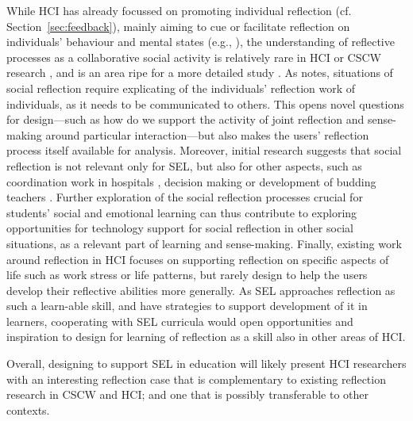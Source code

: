 \documentclass[prodmode,acmtochi]{acmsmall}
\begin{document}
While HCI has already focussed on promoting individual reflection (cf. Section~\ref{sec:feedback}), mainly aiming to cue or facilitate reflection on individuals' behaviour and mental states (e.g., \cite{Sas2011,Stahl2008,Thieme2011,Isaacs2013}), the understanding of reflective processes as a collaborative social activity is relatively rare in HCI or CSCW research \cite{Fleck2012,Prilla2012}, and is an area ripe for a more detailed study \cite{Baumer2014,Mentis2014}. As  notes, situations of social reflection require explicating of the individuals' reflection work of individuals, as it needs to be communicated to others. This opens novel questions for design---such as how do we support the activity of joint reflection and sense-making around particular interaction---but also makes the users' reflection process itself available for analysis.
%
Moreover, initial research suggests that social reflection is not relevant only for SEL, but also for other aspects, such as coordination work in hospitals \cite{Prilla2012}, decision making \cite{Marcu2014} or development of budding teachers \cite{Fleck2009}.  Further exploration of the social reflection processes crucial for students' social and emotional learning can thus contribute to exploring opportunities for technology support for social reflection in other social situations, as a relevant part of learning and sense-making.
%
Finally, existing work around reflection in HCI focuses on supporting reflection on specific aspects of life such as work stress or life patterns, but rarely design to help the users develop their reflective abilities more generally. As SEL approaches reflection as such a learn-able skill, and have strategies to support development of it in learners, cooperating with SEL curricula would open opportunities and inspiration to design for learning of reflection as a skill also in other areas of HCI. 

Overall, designing to support SEL in education will likely present HCI researchers with an interesting reflection case that is complementary to  existing reflection research in CSCW and HCI; and one that is possibly transferable to other contexts.   

\end{document}
